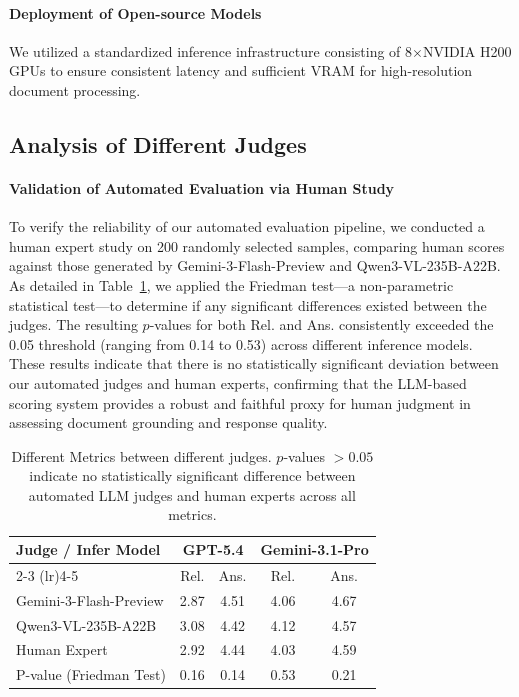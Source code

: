 \documentclass[]{opendatalab}
\begin{document}
{{{\paragraph{Deployment of Open-source Models}We utilized a standardized inference infrastructure consisting of 8$\times$NVIDIA H200 GPUs to ensure consistent latency and sufficient VRAM for high-resolution document processing.


\subsection{Analysis of Different Judges}
\label{Appendix: Analysis of Different Judges}

\paragraph{Validation of Automated Evaluation via Human Study}
To verify the reliability of our automated evaluation pipeline, we conducted a human expert study on 200 randomly selected samples, comparing human scores against those generated by Gemini-3-Flash-Preview and Qwen3-VL-235B-A22B. As detailed in Table~\ref{tab:model-eval}, we applied the Friedman test---a non-parametric statistical test---to determine if any significant differences existed between the judges. The resulting $p$-values for both Rel. and Ans. consistently exceeded the 0.05 threshold (ranging from 0.14 to 0.53) across different inference models. These results indicate that there is no statistically significant deviation between our automated judges and human experts, confirming that the LLM-based scoring system provides a robust and faithful proxy for human judgment in assessing document grounding and response quality.

\begin{table}[htbp]
\centering
\footnotesize
\caption{Different Metrics between different judges. $p$-values $> 0.05$ indicate no statistically significant difference between automated LLM judges and human experts across all metrics.}
\label{tab:model-eval}
\begin{tabular}{lcccc}
\toprule
\multirow{2}{*}{Judge / Infer Model} & \multicolumn{2}{c}{GPT-5.4} & \multicolumn{2}{c}{Gemini-3.1-Pro} \\
\cmidrule(lr){2-3} \cmidrule(lr){4-5}
 & Rel. & Ans. & Rel. & Ans. \\
\midrule
Gemini-3-Flash-Preview & 2.87 & 4.51 & 4.06 & 4.67 \\
\addlinespace
Qwen3-VL-235B-A22B & 3.08 & 4.42 & 4.12 & 4.57 \\
\addlinespace
Human Expert & 2.92 & 4.44 & 4.03 & 4.59\\
\midrule
P-value (Friedman Test) & 0.16 & 0.14 & 0.53 & 0.21 \\
\bottomrule
\end{tabular}
\end{table}

}}}
\end{document}

